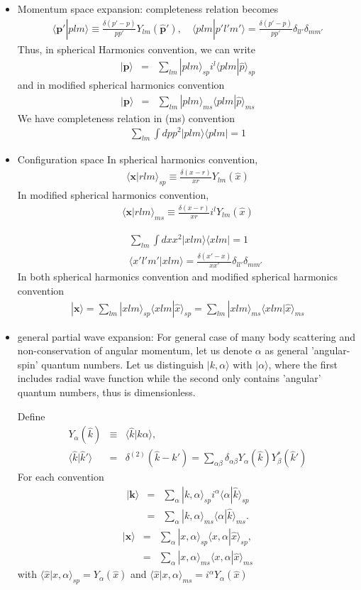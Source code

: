 \documentclass[10pt]{article}
\def\bm{\boldsymbol}
\newcommand{\bea}{\begin{eqnarray}}
\newcommand{\eea}{\end{eqnarray}}
\newcommand{\no}{\nonumber \\}
\def\vp{{\bm p}}
\def\vk{{\bm k}}
\def\vx{{\bm x}}
\def\la{\langle}
\def\ra{\rangle}
\begin{document}
\begin{itemize}
{\bf Note}: In convention 4, because there is no $i^l$
appears in state vectors, we have to explicitly include
$i^l$ in the partial wave expansion.

\item Momentum space expansion: completeness relation becomes
\bea
\la \vp'|p l m\ra\equiv \frac{\delta(p'-p)}{p p'}Y_{lm}(\hat{\vp}'),
\quad \la p lm |p'l'm'\ra=\frac{\delta(p'-p)}{p p'}\delta_{ll'}\delta_{mm'}
\eea
Thus, in spherical Harmonics convention, we 
can write
\bea
|\vp\ra&=&\sum_{lm} |p lm\ra_{sp} i^l \la plm|\hat{p}\ra_{sp}
\eea
and in modified spherical harmonics convention
\bea
|\vp\ra&=&\sum_{lm} |p lm\ra_{ms} \la plm|\hat{p}\ra_{ms}
\eea
We have completeness relation in (ms) convention 
\bea
\sum_{lm}\int dp p^2 |p lm\ra \la p lm|
=1
\eea

\item Configuration space
In spherical harmonics convention,
\bea
\la \vx| r l m\ra_{sp}\equiv 
\frac{\delta(x-r)}{xr} Y_{lm}(\hat{x})
\eea
In modified spherical harmonics convention,
\bea
\la \vx| r l m\ra_{ms}\equiv 
\frac{\delta(x-r)}{xr} i^l Y_{lm}(\hat{x})
\eea

\bea
& &\sum_{lm}\int dx x^2 | xlm\ra \la x lm|=1 \no
& &\la x' l' m'| x lm\ra=\frac{\delta(x'-x)}{xx'}\delta_{ll'}\delta_{mm'}
\eea
In both spherical harmonics convention and 
modified spherical harmonics convention
\bea
|\vx\ra=\sum_{lm} |x lm\ra_{sp} \la x lm|\hat{x}\ra_{sp}
=\sum_{lm} |x lm\ra_{ms} \la x lm|\hat{x}\ra_{ms}         
\eea

\item general partial wave expansion: 
For general case of many body scattering and 
non-conservation of angular momentum, let us
denote $\alpha$ as general
'angular-spin' quantum numbers. 
Let us distinguish
$|k,\alpha\ra$ with $|\alpha\ra$, where the first includes
radial wave function while the second only contains 
'angular' quantum numbers, thus is dimensionless. 

Define
\bea
Y_{\alpha}(\hat{k})&\equiv&\la \hat{k}|k \alpha\ra,\no
\la \hat{k}|\hat{k}'\ra&=&\delta^{(2)}(\hat{k}-\hat{k}')
 =\sum_{\alpha\beta}\delta_{\alpha\beta} 
  Y_{\alpha}(\hat{k})Y_{\beta}^*(\hat{k}')
\eea
For each convention
\bea
|\vk\ra&=&
\sum_\alpha |k, \alpha\ra_{sp}  
                i^\alpha \la \alpha|\hat{k}\ra_{sp}\no
&=&
\sum_\alpha |k, \alpha\ra_{ms}  
            \la \alpha|\hat{k}\ra_{ms}.
\eea
\bea
|\vx\ra&=&\sum_{\alpha} |x,\alpha\ra_{sp} 
           \la x,\alpha|\hat{x}\ra_{sp},\no
       &=&\sum_{\alpha} |x,\alpha\ra_{ms} 
           \la x,\alpha|\hat{x}\ra_{ms}
\eea
with $\la \hat{x}|x,\alpha \ra_{sp}=Y_{\alpha}(\hat{x})$
and $\la \hat{x}|x,\alpha \ra_{ms}=i^\alpha Y_{\alpha}(\hat{x})$


\end{itemize}
\end{document}
